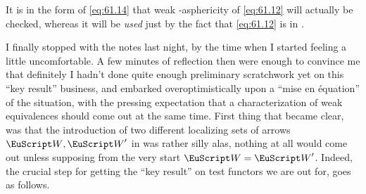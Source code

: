 It is in the form of \eqref{eq:61.14} that weak \scrW-asphericity of
\eqref{eq:61.12} will actually be checked, whereas it will be
\emph{used} just by the fact that \eqref{eq:61.12} is in \scrW.

\bigbreak
\noindent\hfill{}\par

\label{sec:62}%
I finally stopped with the notes last night, by the time when I
started feeling a little uncomfortable. A few minutes of reflection
then were enough to convince me that definitely I hadn't done quite
enough preliminary scratchwork yet on this ``key result'' business,
and embarked overoptimistically upon a ``mise en \'equation'' of the
situation, with the pressing expectation that a characterization of
weak equivalences should come out at the same time. First thing that
became clear, was that the introduction of two different localizing
sets of arrows $\scrW,\scrW'$ in \Cat{} was rather silly alas, nothing
at all would come out unless supposing from the very start
$\scrW=\scrW'$. Indeed, the crucial step for getting the ``key
result'' on test functors we are out for, goes as follows.

